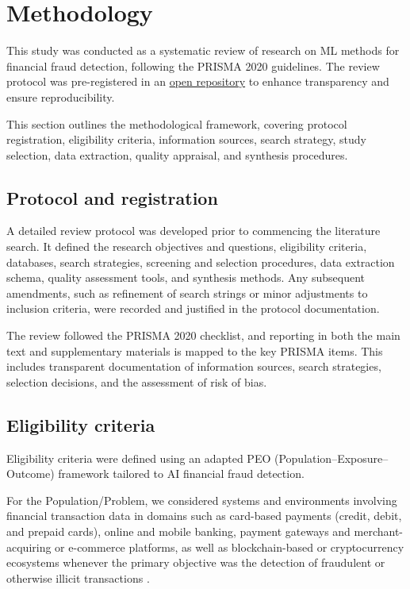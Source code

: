 \documentclass[a4paper,fleqn]{cas-dc}
\begin{document}
\section{Methodology}
\label{sec:methodology}
This study was conducted as a systematic review of research on ML methods for financial fraud detection, following the PRISMA 2020 guidelines. 
The review protocol was pre-registered in an  \href{https://github.com/diogoamaralse/Engineering-AI-Frameworks-for-Real-Time-Financial-Fraud-Detection-A-Systematic-Review}{open repository} to enhance transparency and ensure reproducibility.

This section outlines the methodological framework, covering protocol registration, eligibility criteria, information sources, search strategy, study selection, data extraction, quality appraisal, and synthesis procedures.

\subsection{Protocol and registration}
A detailed review protocol was developed prior to commencing the literature search.
It defined the research objectives and questions, eligibility criteria, databases, search strategies, screening and selection procedures, data extraction schema, quality assessment tools, and synthesis methods. 
Any subsequent amendments, such as refinement of search strings or minor adjustments to inclusion criteria, were recorded and justified in the protocol documentation.

The review followed the PRISMA 2020 checklist, and reporting in both the main text and supplementary materials is mapped to the key PRISMA items. 
This includes transparent documentation of information sources, search strategies, selection decisions, and the assessment of risk of bias.

\subsection{Eligibility criteria}
Eligibility criteria were defined using an adapted PEO (Population–Exposure–Outcome) framework tailored to AI financial fraud detection.

For the Population/Problem, we considered systems and environments involving financial transaction data in domains such as card-based payments (credit, debit, and prepaid cards), online and mobile banking, payment gateways and merchant-acquiring or e-commerce platforms, as well as blockchain-based or cryptocurrency ecosystems whenever the primary objective was the detection of fraudulent or otherwise illicit transactions \cite{alutaibi_blockchain_2025, baabdullah_efficiency_2024}.
\end{document}
